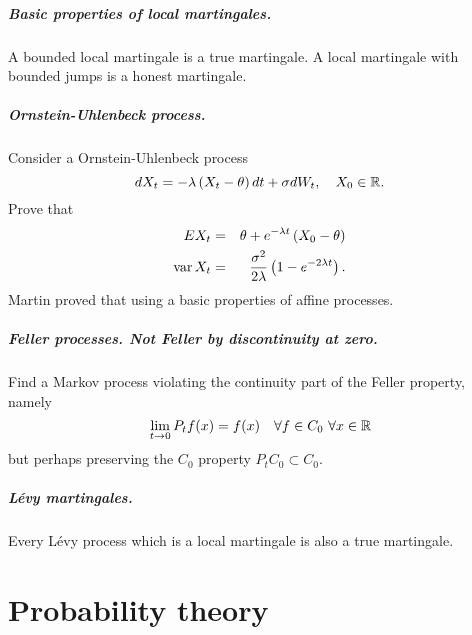 \documentclass[11pt,oldfontcommands,oneside,onecolumn]{memoir}
\begin{document}
\paragraph{Basic properties of local martingales. } A bounded local martingale is a 
true martingale. A local martingale with bounded jumps is a honest martingale.





\paragraph{Ornstein-Uhlenbeck process. } Consider a Ornstein-Uhlenbeck process
\begin{equation}
	dX_t = -\lambda \left( X_t -\theta \right)dt + \sigma dW_t, \quad X_0\in\mathbb R.
\end{equation}
Prove that
\begin{eqnarray}
	EX_t &=& \theta + e^{-\lambda t }\left( X_0 - \theta \right) \\
	\operatorname{var} X_t &=&  \frac{\sigma^2}{ 2 \lambda} \left( 1 - e^{-2\lambda t } \right).
\end{eqnarray}
Martin proved that using a basic properties of affine processes.



\paragraph{Feller processes. Not Feller by discontinuity at zero. }
Find a Markov process violating the continuity part of 
the Feller property, namely
\begin{equation}
\lim_{t\to 0} P_t f(x) = f(x) \quad \forall f \in C_0 \ \forall x\in \mathbb R
\end{equation}
but perhaps preserving the $C_0$ property $P_t C_0 \subset C_0$.




\paragraph{L\'evy martingales.  } Every L\'evy process which is a local
martingale is also a true martingale.












\chapter{Probability theory}
\end{document}
